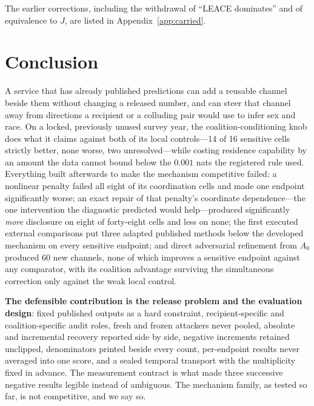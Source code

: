 \documentclass[10pt]{article}
\begin{document}
\noindent The earlier corrections, including the withdrawal of ``LEACE dominates'' and of equivalence
to $J$, are listed in Appendix~\ref{app:carried}.

\section{Conclusion}

A service that has already published predictions can add a reusable channel beside them without
changing a released number, and can steer that channel away from directions a recipient or a colluding
pair would use to infer sex and race. On a locked, previously unused survey year, the
coalition-conditioning knob does what it claims against both of its local controls---14 of 16 sensitive
cells strictly better, none worse, two unresolved---while costing residence capability by an amount the
data cannot bound below the $0.001$ nats the registered rule used. Everything built afterwards to make
the mechanism competitive failed: a nonlinear penalty failed all eight of its coordination cells and
made one endpoint significantly worse; an exact repair of that penalty's coordinate dependence---the
one intervention the diagnostic predicted would help---produced significantly \emph{more} disclosure on
eight of forty-eight cells and less on none; the first executed external comparisons put three adapted published
methods below the developed mechanism on every sensitive endpoint; and direct adversarial refinement from
$A_0$ produced 60 new channels, none of which improves a sensitive endpoint against any comparator, with
its coalition advantage surviving the simultaneous correction only against the weak local control.

\textbf{The defensible contribution is the release problem and the evaluation design}: fixed published
outputs as a hard constraint, recipient-specific and coalition-specific audit roles, fresh and frozen
attackers never pooled, absolute and incremental recovery reported side by side, negative increments
retained unclipped, denominators printed beside every count, per-endpoint results never averaged into
one score, and a sealed temporal transport with the multiplicity fixed in advance. The measurement
contract is what made three successive negative results legible instead of ambiguous. The mechanism
family, as tested so far, is not competitive, and we say so.
\end{document}
